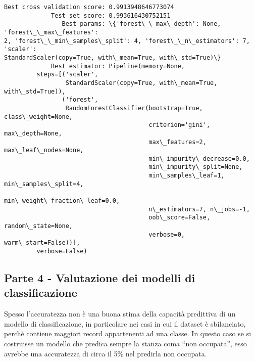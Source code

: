 \documentclass[11pt]{article}
\begin{document}
    \begin{Verbatim}[commandchars=\\\{\}]
Best cross validation score: 0.9913948646773074
             Test set score: 0.993616430752151
                Best params: \{'forest\_\_max\_depth': None, 'forest\_\_max\_features':
2, 'forest\_\_min\_samples\_split': 4, 'forest\_\_n\_estimators': 7, 'scaler':
StandardScaler(copy=True, with\_mean=True, with\_std=True)\}
             Best estimator: Pipeline(memory=None,
         steps=[('scaler',
                 StandardScaler(copy=True, with\_mean=True, with\_std=True)),
                ('forest',
                 RandomForestClassifier(bootstrap=True, class\_weight=None,
                                        criterion='gini', max\_depth=None,
                                        max\_features=2, max\_leaf\_nodes=None,
                                        min\_impurity\_decrease=0.0,
                                        min\_impurity\_split=None,
                                        min\_samples\_leaf=1, min\_samples\_split=4,
                                        min\_weight\_fraction\_leaf=0.0,
                                        n\_estimators=7, n\_jobs=-1,
                                        oob\_score=False, random\_state=None,
                                        verbose=0, warm\_start=False))],
         verbose=False)
\end{Verbatim}

    \hypertarget{parte-4---valutazione-dei-modelli-di-classificazione}{%
\subsection{Parte 4 - Valutazione dei modelli di
classificazione}\label{parte-4---valutazione-dei-modelli-di-classificazione}}

Spesso l'accuratezza non è una buona stima della capacità predittiva di
un modello di classificazione, in particolare nei casi in cui il dataset
è sbilanciato, perchè contiene maggiori record appartenenti ad una
classe. In questo caso se si costruisse un modello che predica sempre la
stanza coma ``non occupata'', esso avrebbe una accuratezza di circa il
5\% nel predirla non occupata.
\end{document}
